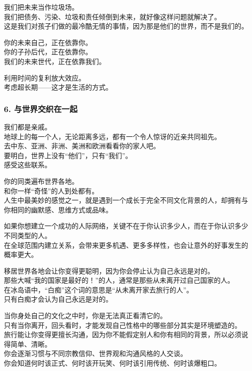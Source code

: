 \documentclass[
]{article}
\begin{document}
我们把未来当作垃圾场。\\
我们把债务、污染、垃圾和责任倾倒到未来，就好像这样问题就解决了。\\
这是我们对孩子们做的最冷酷无情的事情，因为那是他们的世界，而不是我们的。

你的未来自己，正在依靠你。\\
你的子孙后代，正在依靠你。\\
我们的未来世代，正在依靠我们。

利用时间的复利放大效应。\\
考虑超长期------这才是生活的方式。

\subsubsection{6.
与世界交织在一起}\label{6-ux4e0eux4e16ux754cux4ea4ux7ec7ux5728ux4e00ux8d77}

我们都是亲戚。\\
地球上的每一个人，无论距离多远，都有一个令人惊讶的近亲共同祖先。\\
去中东、亚洲、非洲、美洲和欧洲看看你的家人吧。\\
要明白，世界上没有``他们''，只有``我们''。\\
感受这些联系。

你的同类遍布世界各地。\\
和你一样``奇怪''的人到处都有。\\
人生中最美妙的感觉之一，就是遇到一个成长于完全不同文化背景的人，却拥有与你相同的幽默感、思维方式或品味。

如果你想建立一个成功的人际网络，关键不在于你认识多少人，而在于你认识多少不同类型的人。\\
在全球范围内建立关系，会带来更多机遇、更多多样性，也会让意外的好事发生的概率更大。

移居世界各地会让你变得更聪明，因为你会停止认为自己永远是对的。\\
那些大喊``我的国家是最好的！''的人，通常是那些从未离开过自己国家的人。\\
在冰岛语中，``白痴''这个词的意思是``从未离开家去旅行的人''。\\
只有白痴才会认为自己永远是对的。

当你身处自己的文化之中时，你是无法真正看清它的。\\
只有当你离开，回头看时，才能发现自己性格中的哪些部分其实是环境塑造的。\\
旅行能让你变得更擅长沟通，因为你不能假定别人和你有相同的背景，所以必须说得简单、清晰。\\
你会逐渐习惯与不同宗教信仰、世界观和沟通风格的人交谈。\\
你会知道何时该正式、何时该开玩笑、何时该引用传统、何时该爆粗口。
\end{document}
